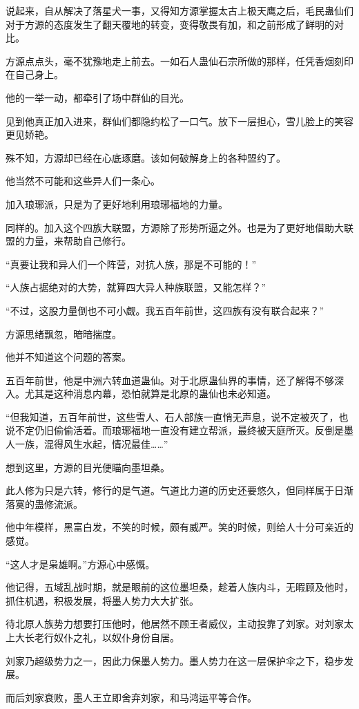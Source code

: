 \begin{this_body}
说起来，自从解决了落星犬一事，又得知方源掌握太古上极天鹰之后，毛民蛊仙们对于方源的态度发生了翻天覆地的转变，变得敬畏有加，和之前形成了鲜明的对比。

方源点点头，毫不犹豫地走上前去。一如石人蛊仙石宗所做的那样，任凭香烟刻印在自己身上。

他的一举一动，都牵引了场中群仙的目光。

见到他真正加入进来，群仙们都隐约松了一口气。放下一层担心，雪儿脸上的笑容更见娇艳。

殊不知，方源却已经在心底琢磨。该如何破解身上的各种盟约了。

他当然不可能和这些异人们一条心。

加入琅琊派，只是为了更好地利用琅琊福地的力量。

同样的。加入这个四族大联盟，方源除了形势所逼之外。也是为了更好地借助大联盟的力量，来帮助自己修行。

“真要让我和异人们一个阵营，对抗人族，那是不可能的！”

“人族占据绝对的大势，就算四大异人种族联盟，又能怎样？”

“不过，这股力量倒也不可小觑。我五百年前世，这四族有没有联合起来？”

方源思绪飘忽，暗暗揣度。

他并不知道这个问题的答案。

五百年前世，他是中洲六转血道蛊仙。对于北原蛊仙界的事情，还了解得不够深入。尤其是这种消息内幕，恐怕就算是北原的蛊仙也未必知道。

“但我知道，五百年前世，这些雪人、石人部族一直悄无声息，说不定被灭了，也说不定仍旧偷偷活着。而琅琊福地一直没有建立帮派，最终被天庭所灭。反倒是墨人一族，混得风生水起，情况最佳……”

想到这里，方源的目光便瞄向墨坦桑。

此人修为只是六转，修行的是气道。气道比力道的历史还要悠久，但同样属于日渐落寞的蛊修流派。

他中年模样，黑富白发，不笑的时候，颇有威严。笑的时候，则给人十分可亲近的感觉。

“这人才是枭雄啊。”方源心中感慨。

他记得，五域乱战时期，就是眼前的这位墨坦桑，趁着人族内斗，无暇顾及他时，抓住机遇，积极发展，将墨人势力大大扩张。

待北原人族势力想要打压他时，他居然不顾王者威仪，主动投靠了刘家。对刘家太上大长老行奴仆之礼，以奴仆身份自居。

刘家乃超级势力之一，因此力保墨人势力。墨人势力在这一层保护伞之下，稳步发展。

而后刘家衰败，墨人王立即舍弃刘家，和马鸿运平等合作。


\end{this_body}
